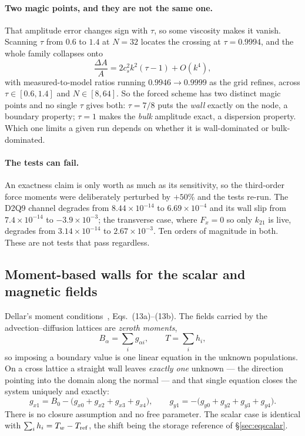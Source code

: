 \documentclass[11pt,a4paper]{article}
\newcommand{\cs}{c_s}
\newcommand{\e}[1]{\times 10^{#1}}
\begin{document}
\paragraph{Two magic points, and they are not the same one.} That amplitude
error changes sign with $\tau$, so some viscosity makes it vanish. Scanning
$\tau$ from $0.6$ to $1.4$ at $N=32$ locates the crossing at $\tau=0.9994$, and
the whole family collapses onto
\begin{equation}
  \frac{\Delta A}{A} = 2\cs^2k^2(\tau-1) + O(k^4),
  \label{eq:ampmagic}
\end{equation}
with measured-to-model ratios running $0.9946 \to 0.9999$ as the grid refines,
across $\tau\in[0.6,1.4]$ and $N\in[8,64]$. So the forced scheme has two
distinct magic points and no single $\tau$ gives both: $\tau=7/8$ puts the
\emph{wall} exactly on the node, a boundary property; $\tau=1$ makes the
\emph{bulk} amplitude exact, a dispersion property. Which one limits a given run
depends on whether it is wall-dominated or bulk-dominated.

\paragraph{The tests can fail.} An exactness claim is only worth as much as its
sensitivity, so the third-order force moments were deliberately perturbed by
$+50\%$ and the tests re-run. The D2Q9 channel degrades from $8.44\e{-14}$ to
$6.69\e{-4}$ and its wall slip from $7.4\e{-14}$ to $-3.9\e{-3}$; the transverse
case, where $F_x=0$ so only $k_{21}$ is live, degrades from $3.14\e{-14}$ to
$2.67\e{-3}$. Ten orders of magnitude in both. These are not tests that pass
regardless.

\subsection{Moment-based walls for the scalar and magnetic fields}
\label{sec:momentbc}

Dellar's moment conditions~\cite{dellar2013bc}, Eqs.~(13a)--(13b). The fields
carried by the advection--diffusion lattices are \emph{zeroth moments},
\begin{equation}
  B_\alpha = \sum_i g_{\alpha i}, \qquad T = \sum_i h_i ,
\end{equation}
so imposing a boundary value is one linear equation in the unknown populations.
On a cross lattice a straight wall leaves \emph{exactly one} unknown --- the
direction pointing into the domain along the normal --- and that single equation
closes the system uniquely and exactly:
\begin{equation}
  \boxed{\;
  g_{x1} = B_0 - \big(g_{x0}+g_{x2}+g_{x3}+g_{x4}\big), \qquad
  g_{y1} = -\big(g_{y0}+g_{y2}+g_{y3}+g_{y4}\big). \;}
  \label{eq:dellar13}
\end{equation}
There is no closure assumption and no free parameter. The scalar case is
identical with $\sum_i h_i = T_w - T_{\rm ref}$, the shift being the storage
reference of \S\ref{sec:eqscalar}.
\end{document}
